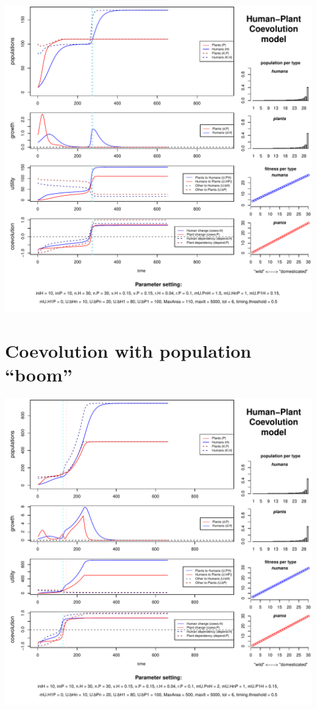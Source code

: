 \documentclass[]{book}
\begin{document}
\includegraphics{hpcModel-exploration_files/figure-latex/1_run.coevo.bleep-plot-1.pdf}

\newpage

\hypertarget{coevolution-with-population-boom}{%
\section{Coevolution with population ``boom''}\label{coevolution-with-population-boom}}

\includegraphics{hpcModel-exploration_files/figure-latex/1_run.coevo.boom-plot-1.pdf}
\end{document}
